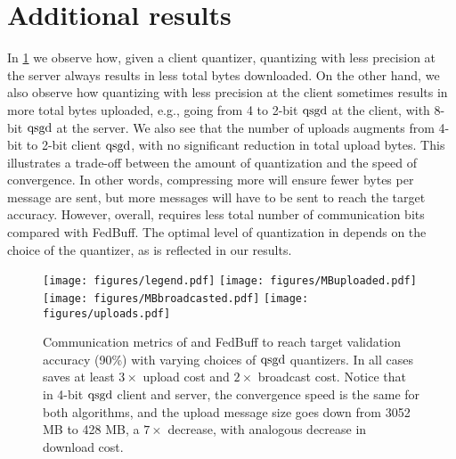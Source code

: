 \section{Additional results}
\label{appsec:additional-results}
In \cref{fig:threefigures} we observe how, given a client quantizer, quantizing with less precision at the server always results in less total bytes downloaded.
On the other hand, we also observe how quantizing with less precision at the client sometimes results in more total bytes uploaded, e.g., going from 4 to 2-bit $\operatorname{qsgd}$ at the client, with 8-bit $\operatorname{qsgd}$ at the server.
We also see that the number of uploads augments from 4-bit to 2-bit client $\operatorname{qsgd}$, with no significant reduction in total upload bytes.
This illustrates a trade-off between the amount of quantization and the speed of convergence.
In other words, compressing more will ensure fewer bytes per message are sent, but more messages will have to be sent to reach the target accuracy.
However, overall, \algname requires less total number of communication bits compared with FedBuff.
The optimal level of quantization in \algname depends on the choice of the quantizer, as is reflected in our results.
\begin{figure*}[!ht]
    \centering
    \hspace{2.5cm} \texttt{[image: figures/legend.pdf]}
    \newline
    \texttt{[image: figures/MBuploaded.pdf]}
    \hfill
    \texttt{[image: figures/MBbroadcasted.pdf]}
    \hfill
    \texttt{[image: figures/uploads.pdf]}
    \caption{Communication metrics of \algname and FedBuff to reach target validation accuracy (90\%) with varying choices of $\operatorname{qsgd}$ quantizers. In all cases \algname saves at least $3\times$ upload cost and $2\times$ broadcast cost. Notice that in 4-bit $\operatorname{qsgd}$ client and server, the convergence speed is the same for both algorithms, and the upload message size goes down from 3052 MB to 428 MB, a $7\times$ decrease, with analogous decrease in download cost.}
    \label{fig:threefigures}
\end{figure*}

